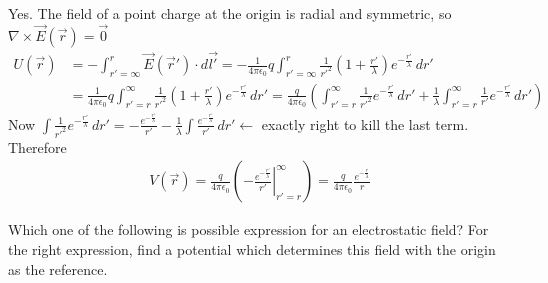 \documentclass[../main.tex]{subfiles}
\begin{document}
\begin{questions}
\begin{solution}
	Yes. The field of a point charge at the origin is radial and symmetric, so $\nabla \times \vec{E}(\vec{r})=\vec{0}$ 
	\begin{align}
		U(\vec{r}) &=-\int_{r'=\infty}^{r} \vec{E}(\vec{r}') \cdot d\vec{l'}=-\frac{1}{4 \pi \epsilon_{0}} q \int_{r'=\infty}^{r} \frac{1}{r'^{2}}\left(1+\frac{r'}{\lambda}\right) e^{-\frac{r'} {\lambda}}\,dr'
	\\
		&=\frac{1}{4 \pi \epsilon_{0}} q \int_{r'=r}^{\infty} \frac{1}{r'^{2}}\left(1+\frac{r'}{\lambda}\right) e^{-\frac{r'}{\lambda}}\,dr'=\frac{q}{4 \pi \epsilon_{0}}\left(\int_{r'=r}^{\infty} \frac{1}{r'^{2}} e^{-\frac{r'} {\lambda}}\,dr'+\frac{1}{\lambda} \int_{r'=r}^{\infty} \frac{1}{r'} e^{-\frac{r'} {\lambda}}\,dr'\right)
	\end{align}
	Now $\int \frac{1}{r'^{2}} e^{-\frac{r'} {\lambda}}\,dr'=-\frac{e^{-\frac{r'}{\lambda}}}{r'}-\frac{1}{\lambda} \int \frac{e^{-\frac{r'}{\lambda}}}{r'}\,dr' \longleftarrow$ exactly right to kill the last term. Therefore
	\begin{align}
		V(\vec{r})=\frac{q}{4 \pi \epsilon_{0}}\left(-\left.\frac{e^{-\frac{r'} {\lambda}}}{r'}\right|_{r'=r} ^{\infty}\right)=\boxed{\frac{q}{4 \pi \epsilon_{0}} \frac{e^{-\frac{r} {\lambda}}}{r}}
	\end{align}
\end{solution}

\question Which one of the following is possible expression for an electrostatic field? For the right expression, find a potential which determines this field with the origin as the reference.
\end{questions}
\end{document}
